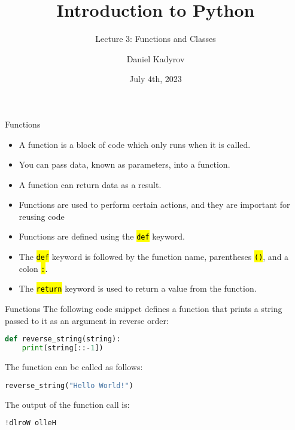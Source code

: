 \documentclass[
    aspectratio=169, 
    usepdftitle=false, 
    xcolor={dvipsnames},
    hyperref={
        colorlinks,
        linkcolor=black,
        urlcolor=blue}
    ]{beamer}
\title[Introduction to Python]{Introduction to Python}
\subtitle{Lecture 3: Functions and Classes}
\author{Daniel Kadyrov}
\date{July 4th, 2023}
\let\OldTexttt\texttt
\renewcommand{\texttt}[1]{\OldTexttt{\hl{#1}}}%
\begin{document}
\begin{frame}
    \titlepage
\end{frame}

\begin{frame}{Functions}
    \begin{itemize}
        \item A function is a block of code which only runs when it is called.
        \item You can pass data, known as parameters, into a function.
        \item A function can return data as a result.
        \item Functions are used to perform certain actions, and they are important for reusing code
        \item Functions are defined using the \texttt{def} keyword.
        \item The \texttt{def} keyword is followed by the function name, parentheses \texttt{()}, and a colon \texttt{:}.
        \item The \texttt{return} keyword is used to return a value from the function.
    \end{itemize}
\end{frame}

\begin{frame}[fragile]{Functions}
    The following code snippet defines a function that prints a string passed to it as an argument in reverse order: 

    \begin{lstlisting}[language=Python]
def reverse_string(string):
    print(string[::-1])
    \end{lstlisting}

    The function can be called as follows:

    \begin{lstlisting}[language=Python]
reverse_string("Hello World!")
    \end{lstlisting}

    The output of the function call is:

    \begin{lstlisting}[language=Python]
!dlroW olleH
    \end{lstlisting}
\end{frame}
\end{document}
